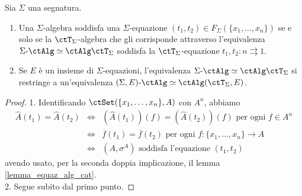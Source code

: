 \begin{corollary}\label{cor_equaz_alg_cat}
 Sia \(\Sigma\) una segnatura.
 \begin{enumerate}
  \item %
        Una \(\Sigma\)-algebra soddisfa una \(\Sigma\)-equazione \((t_1,t_2) \in F_\Sigma(\{x_1,\ldots,x_n\})\) se e solo se la
        \(\ctT_\Sigma\)-algebra che gli corrisponde attraverso l'equivalenza \(\ctSAlg \simeq \ctAlg\ctT_\Sigma\) soddisfa la
        \(\ctT_\Sigma\)-equazione \(t_1,t_2 \colon n \rightrightarrows 1\).
  \item Se \(E\) è un insieme di \(\Sigma\)-equazioni, l'equivalenza \(\ctSAlg \simeq \ctAlg\ctT_\Sigma\) si restringe a
        un'equivalenza \(\ctSEAlg \simeq \ctAlg(\ctT_\Sigma,E)\).
 \end{enumerate}
\end{corollary}

\begin{proof}
 1. Identificando \(\ctSet(\{x_1,\ldots,x_n\},A)\) con \(A^n\), abbiamo
 \[\begin{array}{rcl}
   \widehat{A}(t_1) = \widehat{A}(t_2) & \Leftrightarrow & (\widehat{A}(t_1))(f) = (\widehat{A}(t_2))(f) \mbox{ per ogni } f \in A^n                 \\
                                       & \Leftrightarrow & \overline{f}(t_1) = \overline{f}(t_2) \mbox{ per ogni } f \colon \{x_1,\ldots,x_n\} \to A \\
                                       & \Leftrightarrow & (A,\sigma^A) \mbox{ soddisfa l'equazione }  (t_1,t_2)
  \end{array}\]
 avendo usato, per la seconda doppia implicazione, il lemma \ref{lemma_equaz_alg_cat}. \\
 2. Segue subito dal primo punto.
\end{proof}

